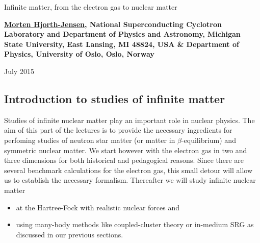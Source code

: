 \documentclass[%
oneside,                 %
final,                   %
10pt]{article}
\begin{document}






\thispagestyle{empty}

\begin{center}
{\LARGE\bf
\begin{spacing}{1.25}
Infinite matter, from the electron gas to nuclear matter
\end{spacing}
}
\end{center}


\begin{center}
{\bf \href{{http://computationalphysics.no}}{Morten Hjorth-Jensen}, National Superconducting Cyclotron Laboratory and Department of Physics and Astronomy, Michigan State University, East Lansing, MI 48824, USA {\&} Department of Physics, University of Oslo, Oslo, Norway${}^{}$} \\ [0mm]
\end{center}

\begin{center}
\end{center}
    

\begin{center} %
July 2015
\end{center}

\vspace{1cm}


\tableofcontents


\vspace{1cm} %




\subsection{Introduction to studies of infinite matter}


Studies of infinite nuclear matter play an important role  in nuclear physics. The aim of this part of the lectures is to provide the necessary ingredients for perfoming studies of neutron star matter (or matter in $\beta$-equilibrium) and symmetric nuclear matter. We start however with the electron gas in two and three dimensions for both historical and pedagogical reasons. Since there are several benchmark calculations for the electron gas, this small detour will allow us to establish the necessary formalism. Thereafter we will study infinite nuclear matter 
\begin{itemize}
\item at the Hartree-Fock with realistic nuclear forces and

\item using many-body methods like coupled-cluster theory or in-medium SRG as discussed in our previous sections.
\end{itemize}
\end{document}
